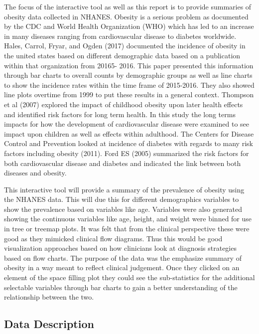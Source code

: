 \documentclass[12pt]{article}
\numberwithin{figure}{section}
\begin{document}
The focus of the interactive tool as well as this report is to provide summaries of obesity data collected in NHANES.  Obesity is a serious problem as documented by the CDC and World Health Organization (WHO) which has led to an increase in many diseases ranging from cardiovascular disease to diabetes worldwide.  Hales, Carrol, Fryar, and Ogden (2017) documented the incidence of obesity in the united states based on different demographic data based on a publication within that organization from 20165- 2016.  This paper presented this information through bar charts to overall counts by demographic groups as well as line charts to show the incidence rates within the time frame of 2015-2016. They also showed line plots overtime from 1999 to put these results in a general context.  Thompson et al (2007) explored the impact of childhood obesity upon later health effects and identified risk factors for long term health.  In this study the long terms impacts for how the development of cardiovascular disease were examined to see impact upon children as well as effects within adulthood.  The Centers for Disease Control and Prevention looked at incidence of diabetes with regards to many risk factors including obesity (2011).  Ford ES (2005) summarized the risk factors for both cardiovascular disease and diabetes and indicated the link between both diseases and obesity.

This interactive tool will provide a summary of the prevalence of obesity using the NHANES data.  This will due this for different demographics variables to show the prevalence based on variables like age.  Variables were also generated showing the continuous variables like age, height, and weight were binned for use in tree or treemap plots.  It was felt that from the clinical perspective these were good as they mimicked clinical flow diagrams.  Thus this would be good visualization approaches based on how clinicians look at diagnosis strategies based on flow charts.  The purpose of the data was the emphasize summary of obesity in a way meant to reflect clinical judgement.  Once they clicked on an element of the space filling plot they could see the sub-statistics for the additional selectable variables through bar charts to gain a better understanding of the relationship between the two.


\vspace{5 mm}

{\subsection {Data Description}}
\end{document}
